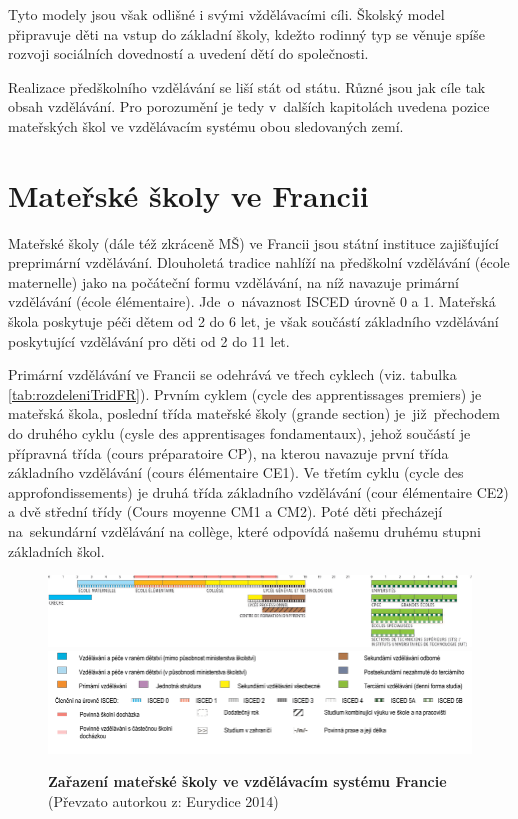 		Tyto modely jsou však odlišné i svými vždělávacími cíli. Školský model připravuje děti na vstup do základní školy, kdežto rodinný typ se věnuje spíše rozvoji sociálních dovedností a uvedení dětí do společnosti.

		Realizace předškolního vzdělávání se liší stát od státu. Různé jsou jak cíle tak obsah vzdělávání. Pro porozumění je tedy v~dalších kapitolách uvedena pozice mateřských škol ve vzdělávacím systému obou sledovaných zemí. 
		

	\section{Mateřské školy ve Francii}
	\label{msvefr}

		Mateřské školy (dále též zkráceně MŠ) ve Francii jsou státní instituce zajišťující preprimární vzdělávání. 
		Dlouholetá tradice nahlíží na předškolní vzdělávání (école maternelle) jako na počáteční formu vzdělávání, na níž navazuje primární vzdělávání (école élémentaire). Jde o návaznost ISCED  úrovně 0 a 1. Mateřská škola poskytuje péči dětem od 2 do 6 let, je však součástí základního vzdělávání poskytující vzdělávání pro děti od 2 do 11 let.

		Primární vzdělávání ve Francii se odehrává ve třech cyklech (viz. tabulka \ref{tab:rozdeleniTridFR}). Prvním cyklem (cycle des apprentissages premiers) je mateřská škola, poslední třída mateřské školy (grande section) je již přechodem do druhého cyklu (cysle des apprentisages fondamentaux), jehož součástí je přípravná třída (cours préparatoire CP), na kterou navazuje první třída základního vzdělávání (cours élémentaire CE1). Ve třetím cyklu (cycle des approfondissements) je druhá třída základního vzdělávání (cour élémentaire CE2) a dvě střední třídy (Cours moyenne CM1 a CM2). Poté děti přecházejí na sekundární vzdělávání na collège, které odpovídá našemu druhému stupni základních škol. 

		\begin{figure} [h!]
			\center
			\includegraphics[width=1.0\linewidth]{fotky/msFR.png} \\
			\includegraphics[width=1.0\linewidth]{fotky/msVysvetlivky.png}
			\caption{ \textbf{Zařazení mateřské školy ve vzdělávacím systému Francie}
			(Převzato autorkou z: Eurydice 2014)
			}
			\label{obr:msFR}
		\end{figure}

